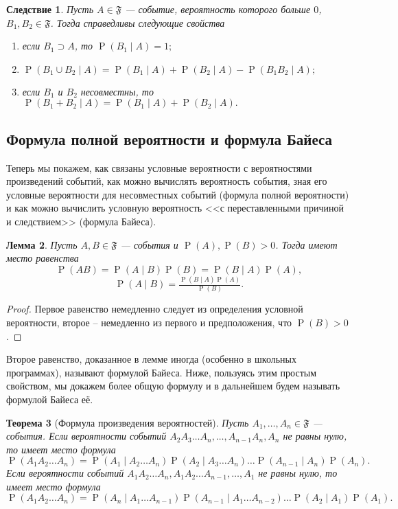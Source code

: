 \documentclass[12pt]{article}
\newtheorem{theorem}{Теорема}
\newtheorem{lemma}[theorem]{Лемма}
\newtheorem{corollary}[theorem]{Следствие}
\numberwithin{theorem}{section}
\numberwithin{proposition}{section}
\theoremstyle{definition}
\newcommand{\prob}{\operatorname{P}}
\newcommand{\events}{\mathfrak{F}}
\begin{document}
	\begin{corollary}
		Пусть $ A \in \events $ --- событие, вероятность которого больше $ 0 $, $ B_1, B_2 \in \events $.
		Тогда справедливы следующие свойства
		\begin{enumerate}
			\item если $ B_1 \supset A $, то $ \prob(B_1 \mid A) = 1; $
			\item $ \prob(B_1 \cup B_2 \mid A) = \prob(B_1 \mid A) + \prob(B_2 \mid A) - \prob(B_1B_2 \mid A); $
			\item если $ B_1 $ и $ B_2 $ несовместны, то $ \prob(B_1 + B_2 \mid A) = \prob(B_1 \mid A) + \prob(B_2 \mid A). $
		\end{enumerate}
	\end{corollary}
	
	\subsection{Формула полной вероятности и формула Байеса}
	
	Теперь мы покажем, как связаны условные вероятности с вероятностями произведений событий, 
	как можно вычислять вероятность события, зная его условные вероятности для несовместных событий (формула полной вероятности)
	и как можно вычислить условную вероятность <<с переставленными причиной и следствием>> (формула Байеса).
	
	\begin{lemma} \label{cond prob}
		Пусть $ A, B \in \events $ --- события и $ \prob(A), \prob(B) > 0 $.
		Тогда имеют место равенства
		$$ \prob(AB) = \prob(A \mid B)\prob(B) = \prob(B \mid A)\prob(A), $$
		$$ \prob(A \mid B) = \tfrac{\prob(B \mid A)\prob(A)}{\prob(B)}. $$
	\end{lemma}
	
	\begin{proof}
		Первое равенство немедленно следует из определения условной вероятности, второе -- немедленно из первого
		и предположения, что $ \prob(B) > 0 $.
	\end{proof}
	
	Второе равенство, доказанное в лемме иногда (особенно в школьных программах), называют формулой Байеса.
	Ниже, пользуясь этим простым свойством, мы докажем более общую формулу и в дальнейшем будем называть формулой Байеса её.
	
	\begin{theorem}[Формула произведения вероятностей] \label{multiplication law}
		Пусть $ A_1, \ldots, A_n \in \events $ --- события.
		Если вероятности событий $ A_2A_3\ldots A_n, \ldots, A_{n - 1}A_n, A_n $ не равны нулю, то имеет место формула
		$$ \prob(A_1A_2\ldots A_n) = \prob(A_1 \mid A_2 \ldots A_n)\prob(A_2 \mid A_3 \ldots A_n) 
		\ldots \prob(A_{n - 1}\mid A_n)\prob(A_n). $$
		Если вероятности событий $ A_1A_2\ldots A_n, A_1A_2\ldots A_{n - 1}, \ldots, A_1 $ не равны нулю, то имеет место формула
		$$ \prob(A_1A_2\ldots A_n) = \prob(A_n \mid A_1\ldots A_{n-1})\prob(A_{n - 1} \mid A_1 \ldots A_{n - 2}) 
		\ldots \prob(A_{2}\mid A_1)\prob(A_1). $$
	\end{theorem}
	
\end{document}

